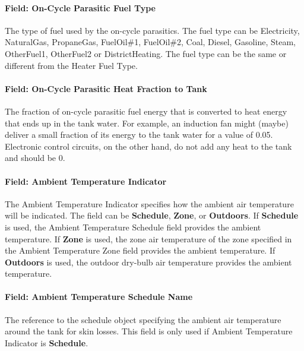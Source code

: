 \paragraph{Field: On-Cycle Parasitic Fuel Type}\label{field-on-cycle-parasitic-fuel-type}

The type of fuel used by the on-cycle parasitics. The fuel type can be Electricity, NaturalGas, PropaneGas, FuelOil\#1, FuelOil\#2, Coal, Diesel, Gasoline, Steam, OtherFuel1, OtherFuel2 or DistrictHeating. The fuel type can be the same or different from the Heater Fuel Type.

\paragraph{Field: On-Cycle Parasitic Heat Fraction to Tank}\label{field-on-cycle-parasitic-heat-fraction-to-tank}

The fraction of on-cycle parasitic fuel energy that is converted to heat energy that ends up in the tank water. For example, an induction fan might (maybe) deliver a small fraction of its energy to the tank water for a value of 0.05. Electronic control circuits, on the other hand, do not add any heat to the tank and should be 0.

\paragraph{Field: Ambient Temperature Indicator}\label{field-ambient-temperature-indicator-000}

The Ambient Temperature Indicator specifies how the ambient air temperature will be indicated. The field can be \textbf{Schedule}, \textbf{Zone}, or \textbf{Outdoors}. If \textbf{Schedule} is used, the Ambient Temperature Schedule field provides the ambient temperature. If \textbf{Zone} is used, the zone air temperature of the zone specified in the Ambient Temperature Zone field provides the ambient temperature. If \textbf{Outdoors} is used, the outdoor dry-bulb air temperature provides the ambient temperature.

\paragraph{Field: Ambient Temperature Schedule Name}\label{field-ambient-temperature-schedule-name-001}

The reference to the schedule object specifying the ambient air temperature around the tank for skin losses. This field is only used if Ambient Temperature Indicator is \textbf{Schedule}.

